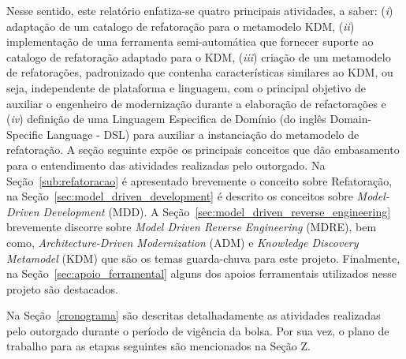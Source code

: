 Nesse sentido, este relatório enfatiza-se quatro principais atividades, a saber: (\textit{i}) adaptação de um catalogo de refatoração para o metamodelo KDM, (\textit{ii}) implementação de uma ferramenta semi-automática que fornecer suporte ao catalogo de refatoração adaptado para o KDM, (\textit{iii}) criação de um metamodelo de refatorações, padronizado que contenha características similares ao KDM, ou seja, independente de plataforma e linguagem, com o principal objetivo de auxiliar o engenheiro de modernização durante a elaboração de refactorações e (\textit{iv}) definição de uma Linguagem Especifica de Domínio (do inglês Domain-Specific Language - DSL) para auxiliar a instanciação do metamodelo de refatoração. A seção seguinte expõe os principais conceitos que dão embasamento para o entendimento das atividades realizadas pelo outorgado. Na Seção~\ref{sub:refatoracao} é apresentado brevemente o conceito sobre Refatoração, na Seção~\ref{sec:model_driven_development} é descrito os conceitos sobre \textit{Model-Driven Development} (MDD). A Seção~\ref{sec:model_driven_reverse_engineering} brevemente discorre sobre \textit{Model Driven Reverse Engineering} (MDRE), bem como, \textit{Architecture-Driven Modernization} (ADM) e \textit{Knowledge Discovery Metamodel} (KDM) que são os temas guarda-chuva para este projeto. Finalmente, na Seção~\ref{sec:apoio_ferramental} alguns dos apoios ferramentais utilizados nesse projeto são destacados.


Na Seção~\ref{cronograma} são descritas detalhadamente as atividades realizadas pelo outorgado durante o período de vigência da bolsa. Por sua vez, o plano de trabalho para as etapas seguintes são mencionados na Seção Z.
